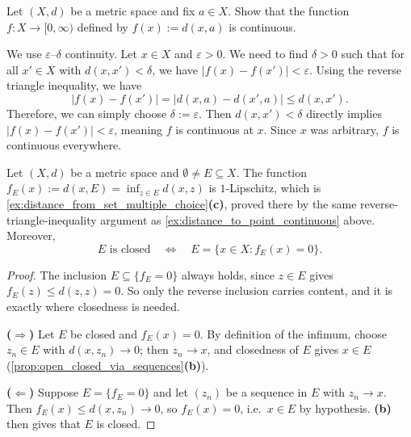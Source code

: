\begin{exercise}
\label{ex:distance_to_point_continuous}
Let $(X, d)$ be a metric space and fix $a \in X$. Show that the function $f : X \to [0,\infty)$ defined by $f(x) := d(x, a)$ is continuous.
\end{exercise}

\begin{exercisesolution}
We use $\varepsilon$--$\delta$ continuity. Let $x \in X$ and $\varepsilon > 0$. We need to find $\delta > 0$ such that for all $x' \in X$ with $d(x, x') < \delta$, we have $|f(x) - f(x')| < \varepsilon$.
Using the reverse triangle inequality, we have
\[|f(x) - f(x')| = |d(x, a) - d(x', a)| \leq d(x, x').\]
Therefore, we can simply choose $\delta := \varepsilon$. Then $d(x, x') < \delta$ directly implies $|f(x) - f(x')| < \varepsilon$, meaning $f$ is continuous at $x$. Since $x$ was arbitrary, $f$ is continuous everywhere.
\end{exercisesolution}

\begin{corollary}
\label{cor:closed_iff_zero_of_distance}
Let $(X,d)$ be a metric space and $\emptyset \neq E \subseteq X$. The function
$f_E(x) := d(x,E) = \inf_{z\in E}d(x,z)$ is $1$-Lipschitz, which is \cref{ex:distance_from_set_multiple_choice}\textbf{(c)},
proved there by the same reverse-triangle-inequality argument as
\cref{ex:distance_to_point_continuous} above. Moreover,
\[E \text{ is closed} \quad\Longleftrightarrow\quad E = \{x \in X : f_E(x) = 0\}.\]
\end{corollary}

\begin{proof}
The inclusion $E \subseteq \{f_E = 0\}$ always holds, since $z \in E$ gives
$f_E(z) \leq d(z,z) = 0$. So only the reverse inclusion carries content, and it is exactly where
closedness is needed.

\textbf{($\Rightarrow$)} Let $E$ be closed and $f_E(x) = 0$. By definition of the infimum, choose
$z_n \in E$ with $d(x,z_n) \to 0$; then $z_n \to x$, and closedness of $E$ gives $x \in E$
(\cref{prop:open_closed_via_sequences}\textbf{(b)}).

\textbf{($\Leftarrow$)} Suppose $E = \{f_E = 0\}$ and let $(z_n)$ be a sequence in $E$ with
$z_n \to x$. Then $f_E(x) \leq d(x,z_n) \to 0$, so $f_E(x) = 0$, i.e.\ $x \in E$ by hypothesis.
\textbf{(b)} then gives that $E$ is closed.
\end{proof}

